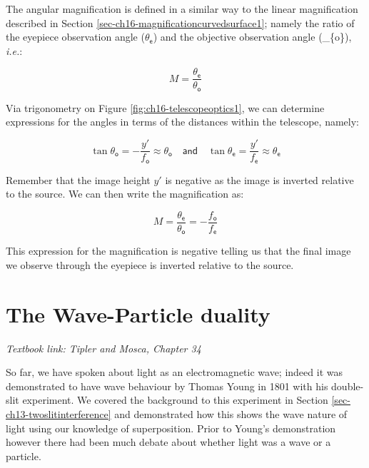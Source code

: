 \documentclass[
]{book}
\begin{document}
The angular magnification is defined in a similar way to the linear magnification described in Section \ref{sec-ch16-magnificationcurvedsurface1}; namely the ratio of the eyepiece observation angle (\(\theta_{\textsf{e}}\)) and the objective observation angle (\theta\_\{\textsf{o}\}), \emph{i.e.}:

\begin{equation}
M = \frac{\theta_{\textsf{e}}}{\theta_{\textsf{o}}}
\end{equation}

Via trigonometry on Figure \ref{fig:ch16-telescopeoptics1}, we can determine expressions for the angles in terms of the distances within the telescope, namely:

\begin{equation}
\tan \theta_{\textsf{o}} = -\frac{y'}{f_{\textsf{o}}} \approx \theta_{\textsf{o}} \quad \textsf{and} \quad \tan \theta_{\textsf{e}} = \frac{y'}{f_{\textsf{e}}} \approx \theta_{\textsf{e}}
\end{equation}

Remember that the image height \(y'\) is negative as the image is inverted relative to the source. We can then write the magnification as:

\begin{equation}
M = \frac{\theta_{\textsf{e}}}{\theta_{\textsf{o}}} = -\frac{f_{\textsf{o}}}{f_{\textsf{e}}}
\end{equation}

This expression for the magnification is negative telling us that the final image we observe through the eyepiece is inverted relative to the source.

\hypertarget{sec-ch17-waveparticle}{%
\chapter{The Wave-Particle duality}\label{sec-ch17-waveparticle}}

\emph{Textbook link: Tipler and Mosca, Chapter 34}

So far, we have spoken about light as an electromagnetic wave; indeed it was demonstrated to have wave behaviour by Thomas Young in 1801 with his double-slit experiment. We covered the background to this experiment in Section \ref{sec-ch13-twoslitinterference} and demonstrated how this shows the wave nature of light using our knowledge of superposition. Prior to Young's demonstration however there had been much debate about whether light was a wave or a particle.
\end{document}

